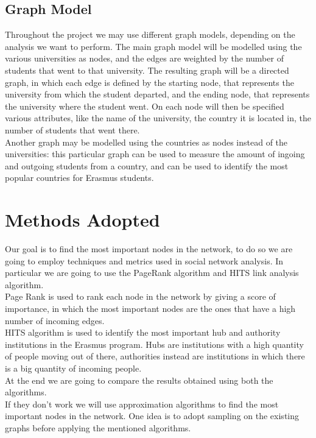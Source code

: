 \subsection{Graph Model}
    Throughout the project we may use different graph models, depending on the analysis we want to perform. The main graph model will be modelled using the various universities as nodes, and the edges are weighted by the number of students that went to that university. The resulting graph will be 
    a directed graph, in which each edge is defined by the starting node, that represents the university from which the student departed, and the ending node, that represents the university 
    where the student went.
    On each node will then be specified various attributes, like the name of the university, the country it is located in, the number of students that went there.
    \\
    Another graph may be modelled using the countries as nodes instead of the universities: this particular graph can be used to measure the amount of ingoing and outgoing students from a country, 
    and can be used to identify the most popular countries for Erasmus students.   

\section{Methods Adopted}
    Our goal is to find the most important nodes in the network, to do so we are going to employ techniques and metrics used in social network analysis. 
    In particular we are going to use the PageRank algorithm and HITS link analysis algorithm.
    \\Page Rank is used to rank each node in the network by giving a score of importance, in which the most important nodes are the ones that have a high number of incoming edges.
    \\HITS algorithm is used to identify the most important hub and authority institutions in the Erasmus program. Hubs are institutions with a 
    high quantity of people moving out of there, authorities instead are institutions in which there is a big quantity of incoming people.
    \\
    At the end we are going to compare the results obtained using both the algorithms.
    \\If they don't work we will use approximation algorithms to find the most important nodes in the network. 
    One idea is to adopt sampling on the existing graphs before applying the mentioned algorithms. 

